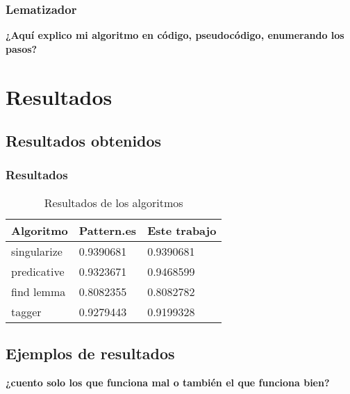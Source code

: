\documentclass{beamer}
\begin{document}
\begin{frame}
\frametitle{Lematizador}
\textbf{¿Aquí explico mi algoritmo en código, pseudocódigo, enumerando los pasos?}
\end{frame}

\section{Resultados}
\subsection{Resultados obtenidos}
\begin{frame}
\frametitle{Resultados}
\begin{table}
\begin{tabular}{l l l}
\toprule
\textbf{Algoritmo} & \textbf{Pattern.es} & \textbf{Este trabajo}\\
\midrule
singularize & 0.9390681  & 0.9390681 \\
predicative & 0.9323671  & 0.9468599 \\
find lemma  & 0.8082355  & 0.8082782 \\
tagger      & 0.9279443  & 0.9199328 \\
\bottomrule
\end{tabular}
\caption{Resultados de los algoritmos}
\end{table}
\end{frame}


\subsection{Ejemplos de resultados}
\begin{frame}
\textbf{¿cuento solo los que funciona mal o también el que funciona bien?}
\end{frame}

\end{document}
